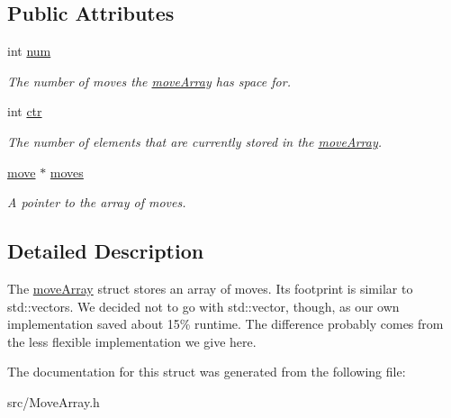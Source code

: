 \subsection*{Public Attributes}
\begin{DoxyCompactItemize}
\item 
int \hyperlink{structmoveArray_a5613065aad1d00414461f416c6b4b724}{num}\hypertarget{structmoveArray_a5613065aad1d00414461f416c6b4b724}{}\label{structmoveArray_a5613065aad1d00414461f416c6b4b724}

\begin{DoxyCompactList}\small\item\em The number of moves the \hyperlink{structmoveArray}{move\+Array} has space for. \end{DoxyCompactList}\item 
int \hyperlink{structmoveArray_a9dbadb0980be9c133d9587c8572a1c49}{ctr}\hypertarget{structmoveArray_a9dbadb0980be9c133d9587c8572a1c49}{}\label{structmoveArray_a9dbadb0980be9c133d9587c8572a1c49}

\begin{DoxyCompactList}\small\item\em The number of elements that are currently stored in the \hyperlink{structmoveArray}{move\+Array}. \end{DoxyCompactList}\item 
\hyperlink{structmove}{move} $\ast$ \hyperlink{structmoveArray_a6f6b1dbbae6cdaea0e321c58a8a1d4ce}{moves}\hypertarget{structmoveArray_a6f6b1dbbae6cdaea0e321c58a8a1d4ce}{}\label{structmoveArray_a6f6b1dbbae6cdaea0e321c58a8a1d4ce}

\begin{DoxyCompactList}\small\item\em A pointer to the array of moves. \end{DoxyCompactList}\end{DoxyCompactItemize}


\subsection{Detailed Description}
The \hyperlink{structmoveArray}{move\+Array} struct stores an array of moves. Its footprint is similar to std\+::vector\textquotesingle{}s. We decided not to go with std\+::vector, though, as our own implementation saved about 15\% runtime. The difference probably comes from the less flexible implementation we give here. 

The documentation for this struct was generated from the following file\+:\begin{DoxyCompactItemize}
\item 
src/Move\+Array.\+h\end{DoxyCompactItemize}
